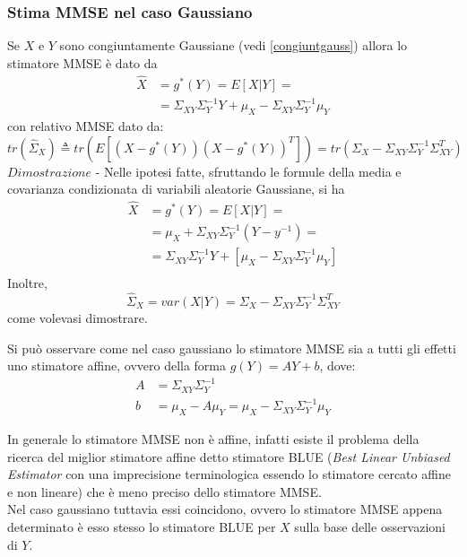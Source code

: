 \subsubsection{Stima MMSE nel caso Gaussiano} 
Se $X$ e $Y$ sono congiuntamente Gaussiane (vedi \eqref{congiuntgauss}) allora lo stimatore MMSE è dato da
\begin{equation}
\begin{split}
\widehat{X}&=g^*(Y)=E[X|Y]=\\
&=\Sigma_{XY}\Sigma_Y^{-1}Y + \mu_{X}-\Sigma_{XY}\Sigma_Y^{-1}\mu_{Y}
\end{split}
\end{equation}
con relativo MMSE dato da:
\begin{equation}
tr(\widehat{\Sigma}_X)\triangleq tr(E[(X-g^*(Y))(X-g^*(Y))^T])=tr(\Sigma_X-\Sigma_{XY}\Sigma_Y^{-1}\Sigma_{XY}^T)
\end{equation}
$Dimostrazione $ - Nelle ipotesi fatte, sfruttando le formule della media e covarianza condizionata di variabili aleatorie Gaussiane, si ha
\begin{equation}
\begin{split}
\widehat{X}&=g^*(Y)=E[X|Y]=\\
&=\mu_{X}+ \Sigma_{XY}\Sigma_Y^{-1}(Y-y^{-1})=\\
&=\Sigma_{XY}\Sigma_Y^{-1}Y+[\mu_{X}-\Sigma_{XY}\Sigma_Y^{-1}\mu_{Y}]\\
\end{split}
\end{equation}
Inoltre,
\begin{equation}
\widehat{\Sigma}_X=var(X|Y)=\Sigma_X- \Sigma_{XY}\Sigma_Y^{-1}\Sigma_{XY}^T 
\end{equation}
come volevasi dimostrare.

Si può osservare come nel caso gaussiano lo stimatore MMSE sia a tutti gli effetti uno stimatore affine, ovvero della forma $g(Y)=AY+b$, dove:
\begin{align}
A&=\Sigma_{XY}\Sigma_Y^{-1}\\
b&=\mu_{X}-A\mu_{Y}=\mu_{X}-\Sigma_{XY}\Sigma_Y^{-1}\mu_{Y}
\end{align}

In generale lo stimatore MMSE non è affine, infatti esiste il problema della ricerca del miglior stimatore affine detto stimatore BLUE (\emph{Best Linear Unbiased Estimator} con una imprecisione terminologica essendo lo stimatore cercato affine e non lineare) che è meno preciso dello stimatore MMSE.\\
Nel caso gaussiano tuttavia essi coincidono, ovvero lo stimatore MMSE appena determinato è esso stesso lo stimatore BLUE per $X$ sulla base delle osservazioni di $Y$.
\newpage